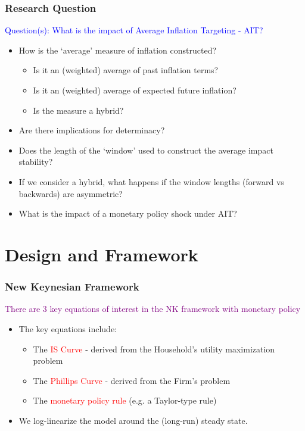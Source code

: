 \documentclass{beamer}
\begin{document}
\begin{frame}
	\frametitle{Research Question}
	\textcolor{blue}{Question(s): What is the impact of Average Inflation Targeting - AIT?}
	\begin{itemize}
		\item How is the `average' measure of inflation constructed?
		\begin{itemize}
			\item Is it an (weighted) average of past inflation terms?
			\item Is it an (weighted) average of expected future inflation?
			\item Is the measure a hybrid?
		\end{itemize}
		\item \setlength\itemsep{1em} Are there implications for determinacy? 
		\item Does the length of the `window' used to construct the average impact stability?
		\item If we consider a hybrid, what happens if the window lengths (forward vs backwards) are asymmetric? 
		\item What is the impact of a monetary policy shock under AIT?
	\end{itemize}
\end{frame}

\section*{Design and Framework}

\begin{frame}
	\frametitle{New Keynesian Framework}
	\textcolor{purple}{There are 3 key equations of interest in the NK framework with monetary policy}
	\vspace{1em}
	\begin{itemize}
		\setlength{\itemsep}{1em}
		\item The key equations include:
		\begin{itemize}
			\setlength{\itemsep}{1em}
			\item The \textcolor{red}{IS Curve} - derived from the Household's utility maximization problem
			\item The \textcolor{red}{Phillips Curve} - derived from the Firm's problem
			\item The \textcolor{red}{monetary policy rule} (e.g. a Taylor-type rule)
		\end{itemize}
		\item We log-linearize the model around the (long-run) steady state.
	\end{itemize}
\end{frame}
\end{document}
